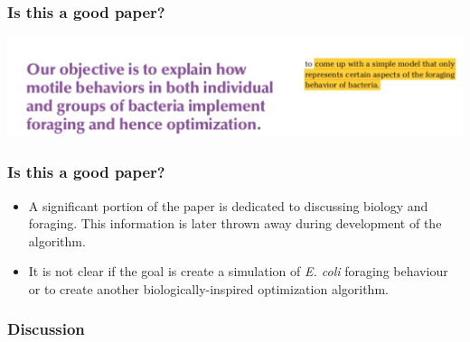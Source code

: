 \documentclass{beamer}
\begin{document}
\begin{frame}
\frametitle{Is this a good paper?}
\begin{center}
\includegraphics[scale=0.3]{assets/yikes}
\end{center}
\end{frame}

\begin{frame}
\frametitle{Is this a good paper?}
\begin{itemize}
  \item<1-> A significant portion of the paper is dedicated to discussing biology and foraging. This information is later thrown away during development of the algorithm.
  \item<2-> It is not clear if the goal is create a simulation of \textit{E. coli} foraging behaviour or to create another biologically-inspired optimization algorithm.
\end{itemize}
\end{frame}

\begin{frame}
\frametitle{Discussion}
\end{frame}
\end{document}
